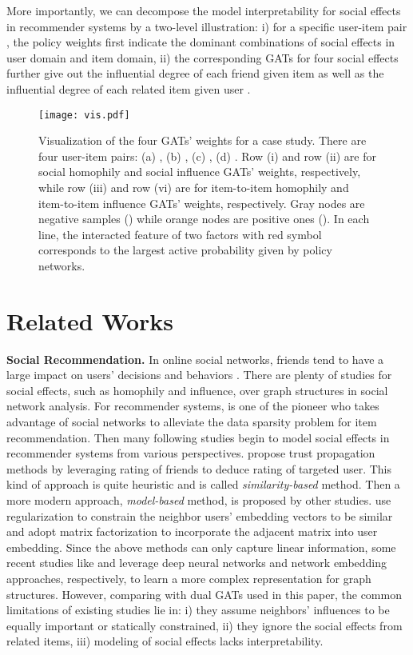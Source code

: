 \documentclass[sigconf]{acmart}
\begin{document}
More importantly, we can decompose the model interpretability for social effects in recommender systems by a two-level illustration: i) for a specific user-item pair , the policy weights first indicate the dominant combinations of social effects in user domain and item domain, ii) the corresponding GATs for four social effects further give out the influential degree of each friend given item  as well as the influential degree of each related item given user .

\begin{figure}[h]
	\centering
	\texttt{[image: vis.pdf]}
	\caption{Visualization of the four GATs' weights for a case study. There are four user-item pairs: (a) , (b) , (c) , (d) . Row (i) and row (ii) are for social homophily and social influence GATs' weights, respectively, while row (iii) and row (vi) are for item-to-item homophily and item-to-item influence GATs' weights, respectively. Gray nodes are negative samples () while orange nodes are positive ones (). In each line, the interacted feature of two factors with red symbol corresponds to the largest active probability given by policy networks.}
	\label{fig-vis} 
	\vspace{-10pt}
\end{figure}

\section{Related Works}

\textbf{Social Recommendation.} In online social networks, friends tend to have a large impact on users' decisions and behaviors \cite{diffuse1, diffuse2}. There are plenty of studies for social effects, such as homophily\cite{Homophily} and influence\cite{Influence}, over graph structures in social network analysis. For recommender systems, \cite{earliest} is one of the pioneer who takes advantage of social networks to alleviate the data sparsity problem for item recommendation. Then many following studies begin to model social effects in recommender systems from various perspectives. \cite{Trust1,Trust2,Trust3} propose trust propagation methods by leveraging rating of friends to deduce rating of targeted user. This kind of approach is quite heuristic and is called \emph{similarity-based} method. Then a more modern approach, \emph{model-based} method, is proposed by other studies. \cite{SocReg,SocialMF} use regularization to constrain the neighbor users' embedding vectors to be similar and \cite{MF1,MF2,TrustMF} adopt matrix factorization to incorporate the adjacent matrix into user embedding. Since the above methods can only capture linear information, some recent studies like \cite{Deep1,NSCR} and \cite{SREPS,NetRep1,DBLP:conf/cikm/ZhangLNLX18} leverage deep neural networks and network embedding approaches, respectively, to learn a more complex representation for graph structures. However, comparing with dual GATs used in this paper, the common limitations of existing studies lie in: i) they assume neighbors' influences to be equally important or statically constrained, ii) they ignore the social effects from related items, iii) modeling of social effects lacks interpretability.
\end{document}
